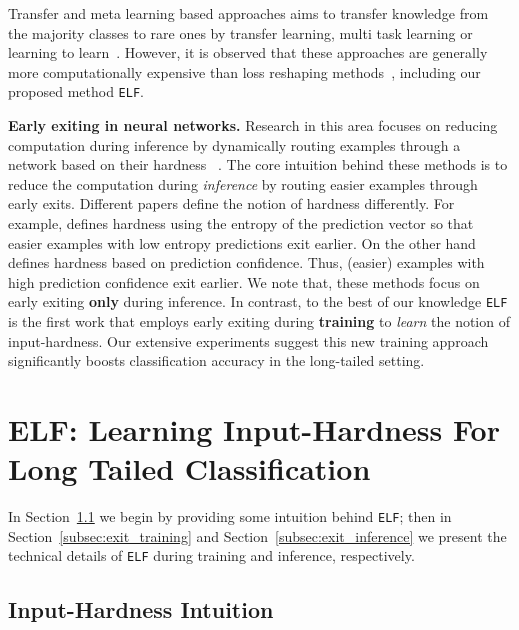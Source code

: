 \documentclass{article}
\newcommand{\method}{\texttt{ELF}\xspace}
\begin{document}
Transfer and meta learning based approaches aims to transfer knowledge from the majority classes to rare ones by transfer learning, multi task learning or learning to learn~\cite{liu2019large, yin2019feature, cui2018large}.
However, it is observed that these approaches are generally more computationally expensive than loss reshaping methods~\cite{cao2019learning}, including our proposed method \method{}.


\textbf{Early exiting in neural networks.}
Research in this area focuses on reducing computation during inference by dynamically routing examples through a network based on their hardness 
~\cite{teerapittayanon2016branchynet,Huang2018MultiScaleDN,phuong2019distillation,hu2020triple}. 
The core intuition behind these methods is to reduce the computation during \textit{inference} by routing easier examples through early exits.
Different papers define the notion of hardness differently.
For example, \cite{teerapittayanon2016branchynet} defines hardness using the entropy of the prediction vector so that easier examples with low entropy predictions exit earlier. 
On the other hand \cite{Huang2018MultiScaleDN,phuong2019distillation,hu2020triple} defines hardness based on prediction confidence. 
Thus, (easier) examples with high prediction confidence exit earlier.
We note that, these methods focus on early exiting \textbf{only} during inference.
In contrast, to the best of our knowledge \method{} is the first work that employs early exiting during \textbf{training} to \textit{learn} the notion of input-hardness. 
Our extensive experiments suggest this new training approach significantly boosts classification accuracy in the long-tailed setting. 














%
 \section{ELF: Learning Input-Hardness For Long Tailed Classification}
In Section~\ref{subsec:intuition} we begin by providing some intuition behind \method{}; then in Section~\ref{subsec:exit_training} and Section~\ref{subsec:exit_inference} we present the 
technical details of \method{} during training and inference, respectively.

\subsection{Input-Hardness Intuition}\label{subsec:intuition}
\end{document}
